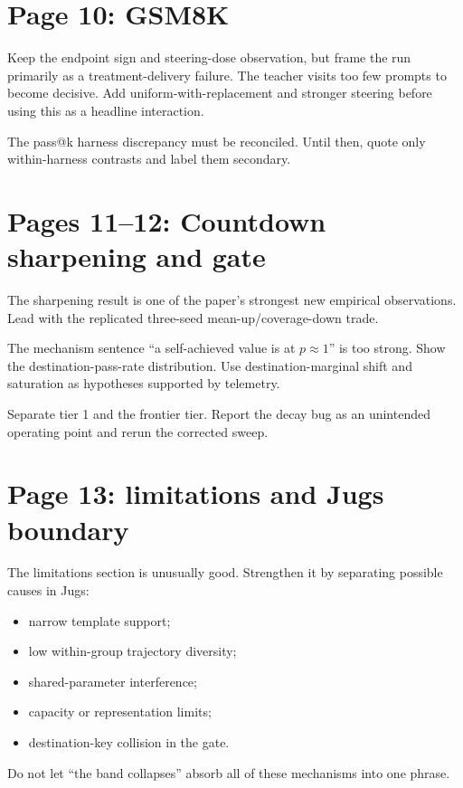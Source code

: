 \documentclass[11pt]{article}
\theoremstyle{definition}
\theoremstyle{remark}
\begin{document}
\section{Page 10: GSM8K}

Keep the endpoint sign and steering-dose observation, but frame the run primarily as a treatment-delivery failure. The teacher visits too few prompts to become decisive. Add uniform-with-replacement and stronger steering before using this as a headline interaction.

The pass@k harness discrepancy must be reconciled. Until then, quote only within-harness contrasts and label them secondary.

\section{Pages 11--12: Countdown sharpening and gate}

The sharpening result is one of the paper's strongest new empirical observations. Lead with the replicated three-seed mean-up/coverage-down trade.

The mechanism sentence ``a self-achieved value is at $p\approx1$'' is too strong. Show the destination-pass-rate distribution. Use destination-marginal shift and saturation as hypotheses supported by telemetry.

Separate tier 1 and the frontier tier. Report the decay bug as an unintended operating point and rerun the corrected sweep.

\section{Page 13: limitations and Jugs boundary}

The limitations section is unusually good. Strengthen it by separating possible causes in Jugs:

\begin{itemize}[leftmargin=2em]
\item narrow template support;
\item low within-group trajectory diversity;
\item shared-parameter interference;
\item capacity or representation limits;
\item destination-key collision in the gate.
\end{itemize}

Do not let ``the band collapses'' absorb all of these mechanisms into one phrase.
\end{document}
